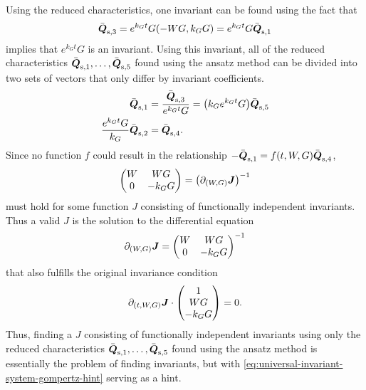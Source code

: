 Using the reduced characteristics, one invariant can be found using the fact that
\begin{equation*}
  \bar{\vect{Q}}_{\text{s},3} = e^{k_{G} t} G \left(-W G, k_G G\right) = e^{k_{G} t} G \bar{\vect{Q}}_{\text{s},1}
\end{equation*}
implies that \(e^{k_{G} t} G\) is an invariant.
Using this invariant, all of the reduced characteristics \(\bar{\boldsymbol{Q}}_{\text{s},1}, \dots, \bar{\boldsymbol{Q}}_{\text{s},5}\) found using the ansatz method can be divided into two sets of vectors that only differ by invariant coefficients.
\begin{align*}
  \bar{\vect{Q}}_{\text{s},1} &= \frac{\bar{\vect{Q}}_{\text{s},3}}{e^{k_{G} t} G} = \left(k_G e^{k_{G} t} G\right) \bar{\vect{Q}}_{\text{s},5} \\
  \frac{e^{k_{G} t} G}{k_G} \bar{\vect{Q}}_{\text{s},2} &= \bar{\vect{Q}}_{\text{s},4}.
\end{align*}
Since no function \(f\) could result in the relationship \(-\bar{\boldsymbol{Q}}_{\text{s},1} = f(t, W, G) \bar{\boldsymbol{Q}}_{\text{s},4}\),
\begin{equation*}
  \begin{pmatrix}
    W & W G \\
    0 & -k_G G
  \end{pmatrix}
  = \left(\partial_{(W, G)} \vect{J}\right)^{-1}
\end{equation*}
must hold for some function \(J\) consisting of functionally independent invariants.
Thus a valid \(J\) is the solution to the differential equation
\begin{equation} \label{eq:universal-invariant-system-gompertz-hint}
  \partial_{(W, G)} \boldsymbol{J} =
  \begin{pmatrix}
    W & W G \\
    0 & -k_G G
  \end{pmatrix}^{-1}
\end{equation}
that also fulfills the original invariance condition
\begin{equation*}
  \partial_{(t, W, G)} \boldsymbol{J} \cdot
  \begin{pmatrix}
    1 \\
    W G \\
    -k_G G
  \end{pmatrix}
  = 0.
\end{equation*}
Thus, finding a \(J\) consisting of functionally independent invariants using only the reduced characteristics \(\bar{\boldsymbol{Q}}_{\text{s},1}, \dots, \bar{\boldsymbol{Q}}_{\text{s},5}\) found using the ansatz method is essentially the problem of finding invariants, but with \cref{eq:universal-invariant-system-gompertz-hint} serving as a hint.
